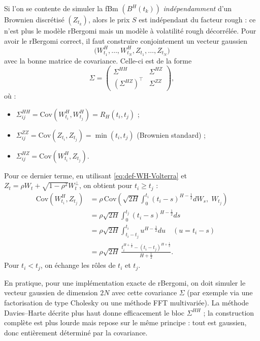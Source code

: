 \documentclass[11pt,a4paper]{article}
\newcommand{\Cov}{\mathrm{Cov}}
\newcommand{\1}{\mathbf{1}}
\newcommand{\bH}{B^{H}}
\begin{document}
Si l'on se contente de simuler la fBm $(\bH(t_k))$ \emph{indépendamment}
d'un Brownien discrétisé $(Z_{t_k})$, alors le prix $S$ est
indépendant du facteur rough : ce n'est plus le modèle rBergomi mais
un modèle à volatilité rough décorrélée. Pour avoir le rBergomi
correct, il faut construire conjointement un vecteur gaussien
\[
  \bigl(W_{t_1}^H,\dots,W_{t_N}^H,
        Z_{t_1},\dots,Z_{t_N}\bigr)
\]
avec la bonne matrice de covariance. Celle-ci est de la forme
\[
  \Sigma =
  \begin{pmatrix}
    \Sigma^{HH} & \Sigma^{HZ} \\
    (\Sigma^{HZ})^\top & \Sigma^{ZZ}
  \end{pmatrix},
\]
où :
\begin{itemize}
  \item $\Sigma^{HH}_{ij}
         = \Cov(W_{t_i}^H,W_{t_j}^H)
         = R_H(t_i,t_j)$ ;
  \item $\Sigma^{ZZ}_{ij}
         = \Cov(Z_{t_i},Z_{t_j})
         = \min(t_i,t_j)$ (Brownien standard) ;
  \item $\Sigma^{HZ}_{ij}
         = \Cov(W_{t_i}^H,Z_{t_j})$.
\end{itemize}

Pour ce dernier terme, en utilisant \eqref{eq:def-WH-Volterra} et
$Z_t = \rho W_t +\sqrt{1-\rho^2}W_t^\perp$, on obtient pour
$t_i\ge t_j$ :
\begin{align}
  \Cov(W_{t_i}^H,Z_{t_j})
  &= \rho\,\Cov\!\left(
        \sqrt{2H}\int_0^{t_i}(t_i-s)^{H-\frac12}dW_s,\;
        W_{t_j}
      \right) \\
  &= \rho\sqrt{2H}\int_0^{t_j}(t_i-s)^{H-\frac12}ds \\[0.3em]
  &= \rho\sqrt{2H}
     \int_{t_i-t_j}^{t_i} u^{H-\frac12}du
     \quad (u=t_i-s) \\[0.3em]
  &= \rho\sqrt{2H}\,
     \frac{t_i^{H+\frac12}-(t_i-t_j)^{H+\frac12}}{H+\frac12}.
\end{align}
Pour $t_i<t_j$, on échange les rôles de $t_i$ et $t_j$.

En pratique, pour une implémentation exacte de rBergomi, on doit
simuler le vecteur gaussien de dimension $2N$ avec cette covariance
$\Sigma$ (par exemple via une factorisation de type Cholesky ou une
méthode FFT multivariée). La méthode Davies--Harte décrite plus haut
donne efficacement le bloc $\Sigma^{HH}$ ; la construction complète
est plus lourde mais repose sur le même principe : tout est
gaussien, donc entièrement déterminé par la covariance.

\end{document}
